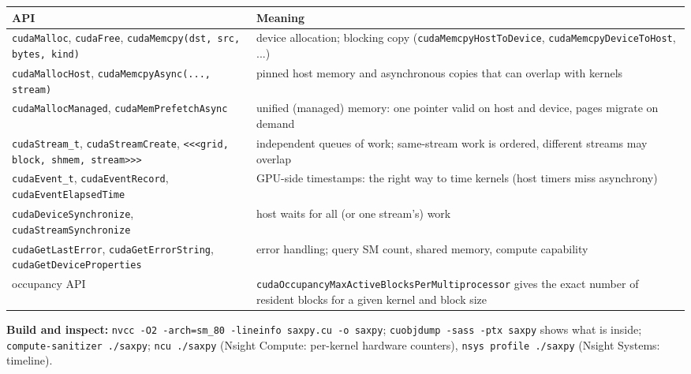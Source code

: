 \documentclass[10pt,a4paper,openany,oneside]{report}
\begin{document}
\begin{center}\small
\begin{xltabular}{\textwidth}{@{}L{5.4cm}Y@{}}
\toprule
\textbf{API} & \textbf{Meaning}\\
\midrule\endhead
\texttt{cudaMalloc}, \texttt{cudaFree}, \texttt{cudaMemcpy(dst, src, bytes, kind)} & device allocation; blocking copy (\texttt{cudaMemcpyHostToDevice}, \texttt{cudaMemcpyDeviceToHost}, ...)\\
\texttt{cudaMallocHost}, \texttt{cudaMemcpyAsync(..., stream)} & pinned host memory and asynchronous copies that can overlap with kernels\\
\texttt{cudaMallocManaged}, \texttt{cudaMemPrefetchAsync} & unified (managed) memory: one pointer valid on host and device, pages migrate on demand\\
\texttt{cudaStream\_t}, \texttt{cudaStreamCreate}, \texttt{<<<grid, block, shmem, stream>>>} & independent queues of work; same-stream work is ordered, different streams may overlap\\
\texttt{cudaEvent\_t}, \texttt{cudaEventRecord}, \texttt{cudaEventElapsedTime} & GPU-side timestamps: the right way to time kernels (host timers miss asynchrony)\\
\texttt{cudaDeviceSynchronize}, \texttt{cudaStreamSynchronize} & host waits for all (or one stream's) work\\
\texttt{cudaGetLastError}, \texttt{cudaGetErrorString}, \texttt{cudaGetDeviceProperties} & error handling; query SM count, shared memory, compute capability\\
occupancy API & \texttt{cudaOccupancyMaxActiveBlocksPerMultiprocessor} gives the exact number of resident blocks for a given kernel and block size\\
\bottomrule
\end{xltabular}
\end{center}
\textbf{Build and inspect:} \texttt{nvcc -O2 -arch=sm\_80 -lineinfo saxpy.cu -o saxpy}; \texttt{cuobjdump -sass -ptx saxpy} shows what is inside; \texttt{compute-sanitizer ./saxpy}; \texttt{ncu ./saxpy} (Nsight Compute: per-kernel hardware counters), \texttt{nsys profile ./saxpy} (Nsight Systems: timeline).
\end{document}
